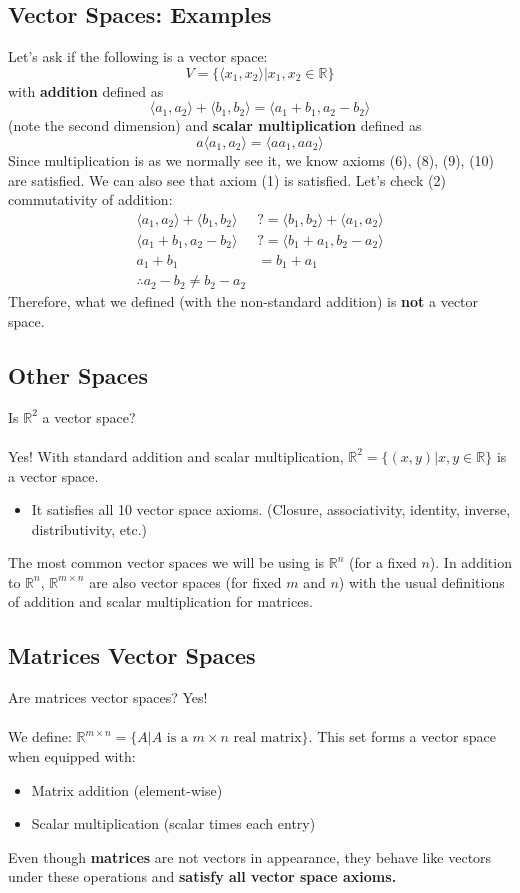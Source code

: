 \documentclass[10pt]{article}
\begin{document}
\subsection*{Vector Spaces: Examples}
Let's ask if the following is a vector space:
\[V = \{\langle x_1, x_2 \rangle | x_1, x_2 \in \mathbb{R}\}\]
with \textbf{addition} defined as
\[\langle a_1, a_2 \rangle + \langle b_1, b_2 \rangle = \langle a_1 + b_1, a_2 - b_2 \rangle\]
(note the second dimension) and \textbf{scalar multiplication} defined as
\[a\langle a_1, a_2 \rangle = \langle aa_1, aa_2 \rangle\]
Since multiplication is as we normally see it, we know axioms (6), (8), (9), (10) are satisfied.  We can also see that axiom (1) is satisfied.  Let's check (2) commutativity of addition:
\begin{align*}
\langle a_1, a_2 \rangle + \langle b_1, b_2 \rangle &?= \langle b_1, b_2 \rangle + \langle a_1, a_2 \rangle\\
\langle a_1 + b_1, a_2 - b_2 \rangle &?= \langle b_1 + a_1, b_2 - a_2 \rangle\\
a_1 + b_1 &= b_1 + a_1\\
\therefore a_2 - b_2 \neq b_2 - a_2
\end{align*}
Therefore, what we defined (with the non-standard addition) is \textbf{not} a vector space.

\subsection*{Other Spaces}
Is $\mathbb{R}^2$ a vector space?\\\\
Yes!  With standard addition and scalar multiplication, $\mathbb{R}^2 = \{(x, y) | x, y \in \mathbb{R}\}$ is a vector space.  
\begin{itemize}
	\item It satisfies all 10 vector space axioms.  (Closure, associativity, identity, inverse, distributivity, etc.)
\end{itemize}
The most common vector spaces we will be using is $\mathbb{R}^n$ (for a fixed $n$).  In addition to $\mathbb{R}^n$, $\mathbb{R}^{m \times n}$ are also vector spaces (for fixed $m$ and $n$) with the usual definitions of addition and scalar multiplication for matrices.

\subsection*{Matrices Vector Spaces}
Are matrices vector spaces?  Yes!\\\\
We define: $\mathbb{R}^{m \times n} = \{A | A \text{ is a $m \times n$ real matrix}\}$.  This set forms a vector space when equipped with:
\begin{itemize}
	\item Matrix addition (element-wise)
	\item Scalar multiplication (scalar times each entry)
\end{itemize}
Even though \textbf{matrices} are not vectors in appearance, they behave like vectors under these operations and \textbf{satisfy all vector space axioms.}
\end{document}
